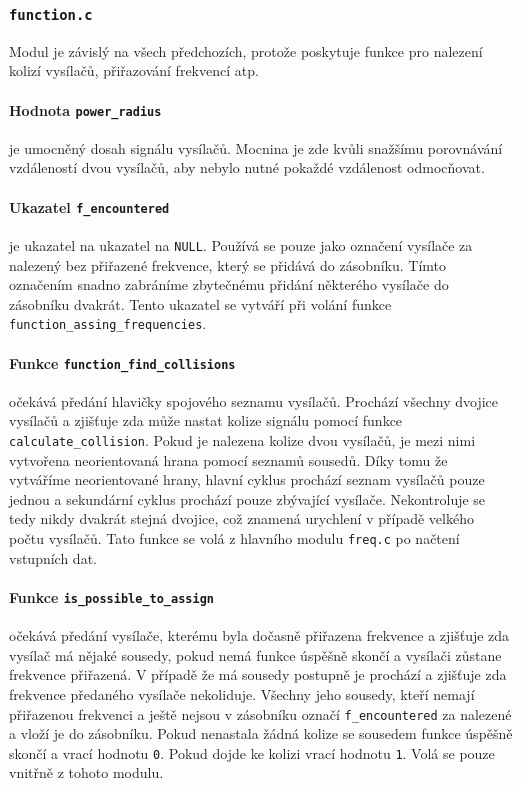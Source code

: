 \documentclass[12pt]{report}
\begin{document}
\subsubsection{\Large{\texttt{function.c}}}
Modul je závislý na všech předchozích, protože poskytuje funkce pro nalezení kolizí vysílačů, přiřazování frekvencí atp.

\cprotect\paragraph{Hodnota \verb|power_radius|}
je umocněný dosah signálu vysílačů. Mocnina je zde kvůli snažšímu porovnávání vzdáleností dvou vysílačů, aby nebylo nutné pokaždé vzdálenost odmocňovat.

\cprotect\paragraph{Ukazatel \verb|f_encountered|}
je ukazatel na ukazatel na \texttt{NULL}. Používá se pouze jako označení vysílače za nalezený bez přiřazené frekvence, který se přidává do zásobníku. Tímto označením snadno zabráníme zbytečnému přidání některého vysílače do zásobníku dvakrát. Tento ukazatel se vytváří při volání funkce \verb|function_assing_frequencies|.

\cprotect\paragraph{Funkce \verb|function_find_collisions|}
očekává předání hlavičky spojového seznamu vysílačů. Prochází všechny dvojice vysílačů a zjišťuje zda může nastat kolize signálu pomocí funkce \verb|calculate_collision|. Pokud je nalezena kolize dvou vysílačů, je mezi nimi vytvořena neorientovaná hrana pomocí seznamů sousedů. Díky tomu že vytváříme neorientované hrany, hlavní cyklus prochází seznam vysílačů pouze jednou a sekundární cyklus prochází pouze zbývající vysílače. Nekontroluje se tedy nikdy dvakrát stejná dvojice, což znamená urychlení v případě velkého počtu vysílačů. Tato funkce se volá z hlavního modulu \verb|freq.c| po načtení vstupních dat.

\cprotect\paragraph{Funkce \verb|is_possible_to_assign|}
očekává předání vysílače, kterému byla dočasně přiřazena frekvence a zjišťuje zda vysílač má nějaké sousedy, pokud nemá funkce úspěšně skončí a vysílači zůstane frekvence přiřazená. V případě že má sousedy postupně je prochází a zjišťuje zda frekvence předaného vysílače nekoliduje. Všechny jeho sousedy, kteří nemají přiřazenou frekvenci a ještě nejsou v zásobníku označí \verb|f_encountered| za nalezené a vloží je do zásobníku. Pokud nenastala žádná kolize se sousedem funkce úspěšně skončí a vrací hodnotu \texttt{0}. Pokud dojde ke kolizi vrací hodnotu \texttt{1}. Volá se pouze vnitřně z tohoto modulu.
\end{document}
